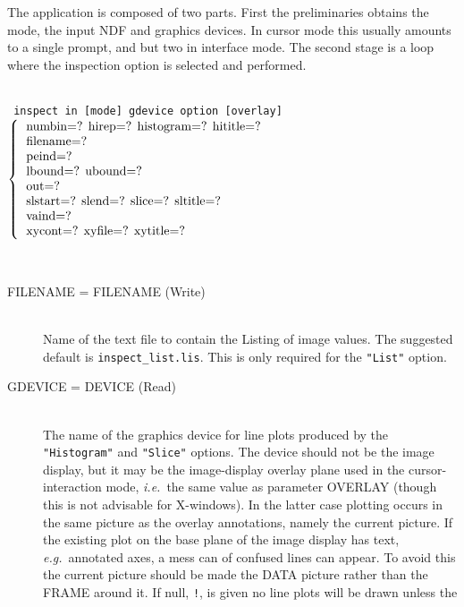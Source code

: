 \documentclass[twoside,11pt]{article}
\newcommand{\htmlref}[2]{#1}
\newcommand{\sstusage}[1]{\pagebreak[3] \item[Usage:] \mbox{} \\[1.3ex] {\ssttt #1}}
\newcommand{\sstparameters}[1]{
   \goodbreak
   \item[Parameters:] \mbox{} \\
   \vspace{-3.5ex}
   \begin{description}
      #1
   \end{description}
}
\newcommand{\sstsubsection}[1]{ \item[{#1}] \mbox{} \\}
\newcommand{\ssttt}{\tt}
\newcommand{\sstusage}[1]{%
      \item[\htmlref{Usage:}{ap:usage}] \mbox{}
      {\ssttt #1}\smallskip%
   }
\newcommand{\sstparameters}[1]{
      \item[\htmlref{Parameters:}{se:param}]
      \begin{description}
         #1
      \end{description}
   }
\newcommand{\sstsubsection}[1]{\item[{#1}]}
\begin{document}
{{      The application is composed of two parts.  First the preliminaries
      obtains the mode, the input NDF and graphics devices.  In cursor
      mode this usually amounts to a single prompt, and but two in
      interface mode.  The second stage is a loop where the inspection
      option is selected and performed.
   }
   \sstusage{
      inspect in [mode] gdevice option [overlay]
        \newline\hspace*{1.5em}
        $\left\{ {\begin{tabular}{l}
                   numbin=? hirep=? histogram=? hititle=? \\
                   filename=? \\
                   peind=? \\
                   lbound=? ubound=? \\
                   out=? \\
                   slstart=? slend=? slice=? sltitle=? \\
                   vaind=? \\
                   xycont=? xyfile=? xytitle=?
                   \end{tabular} }
        \right.$
        \newline\hspace*{1.9em}
        \makebox[0mm][c]{\small option}
   }
   \sstparameters{
      \sstsubsection{
         FILENAME = FILENAME (Write)
      }{
         Name of the text file to contain the Listing of image values.
         The suggested default is {\tt inspect\_list.lis}.  This is only
         required for the {\tt "List"} option.
      }
      \sstsubsection{
         GDEVICE = DEVICE (Read)
      }{
         The name of the graphics device for line plots produced by the
         {\tt "Histogram"} and {\tt "Slice"} options.  The device should
         not be the image display, but it may be the image-display overlay
         plane used in the cursor-interaction mode, {\it i.e.}\ the same
         value as parameter OVERLAY (though this is not advisable for
         X-windows).  In the latter case plotting occurs in the same
         picture as the overlay annotations, namely the current
         picture.  If the existing plot on the base plane of the image
         display has text, {\it e.g.}\ annotated axes, a mess can of confused
         lines can appear.  To avoid this the current picture should be
         made the DATA picture rather than the FRAME around it.  If
         null, {\tt !}, is given no line plots will be drawn unless the
}}}
\end{document}

